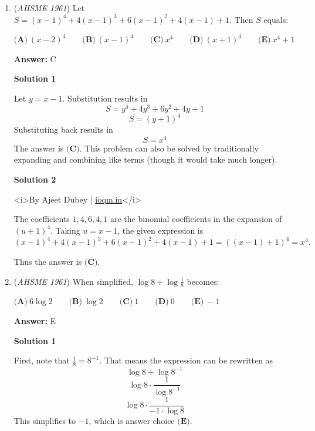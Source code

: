 \begin{enumerate}
 For example, $1+4=5$ is not a square, $1/4$ is not the square of a positive integer, and $\sqrt4=2$ is not such a square. Hence multiplication is the only operation under which the set is closed.

 Thus the answer is $\boxed{\textbf{(B)}}$.

 


	\item (\textit{AHSME 1961}) Let $S=(x-1)^4+4(x-1)^3+6(x-1)^2+4(x-1)+1$. Then $S$ equals:


 $\textbf{(A)}\ (x-2)^4 \qquad \textbf{(B)}\ (x-1)^4 \qquad \textbf{(C)}\ x^4 \qquad \textbf{(D)}\ (x+1)^4 \qquad \textbf{(E)}\ x^4+1$

 \textbf{Answer: }C



\textbf{Solution 1}

Let $y = x-1$.  Substitution results in
 \[S = y^4 + 4y^3 + 6y^2 + 4y + 1\]
 \[S = (y+1)^4\]Substituting back results in
 \[S = x^4\]The answer is $\boxed{\textbf{(C)}}$.  This problem can also be solved by traditionally expanding and combining like terms (though it would take much longer).

 



\textbf{Solution 2}

<i>By Ajeet Dubey | \href{https://ioqm.in}{ioqm.in}</i>

 The coefficients $1,4,6,4,1$ are the binomial coefficients in the expansion of $(u+1)^4$. Taking $u=x-1$, the given expression is$(x-1)^4+4(x-1)^3+6(x-1)^2+4(x-1)+1=((x-1)+1)^4=x^4.$

 Thus the answer is $\boxed{\textbf{(C)}}$.

 


	\item (\textit{AHSME 1961}) When simplified, $\log{8} \div \log{\frac{1}{8}}$ becomes:


 $\textbf{(A)}\ 6\log{2} \qquad \textbf{(B)}\ \log{2} \qquad \textbf{(C)}\ 1 \qquad \textbf{(D)}\ 0\qquad \textbf{(E)}\ -1$

 \textbf{Answer: }E



\textbf{Solution 1}

First, note that $\frac{1}{8} = 8^{-1}$.  That means the expression can be rewritten as
 \[\log{8} \div \log{8^{-1}}\]
 \[\log{8} \cdot \frac{1}{\log{8^{-1}}}\]
 \[\log{8} \cdot \frac{1}{-1 \cdot \log{8}}\]This simplifies to $-1$, which is answer choice $\boxed{\textbf{(E)}}$.


\end{enumerate}
